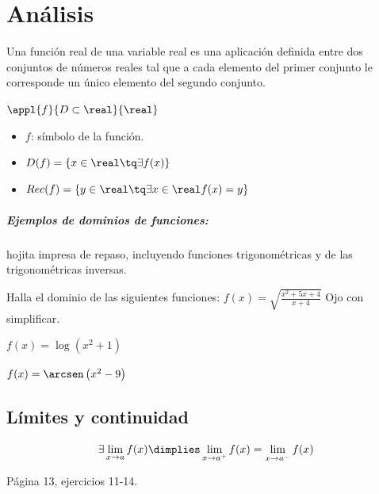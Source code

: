 
\chapter{Análisis}

\begin{defn}
Una función real de una variable real es una aplicación definida entre dos conjuntos de números reales tal que a cada elemento del primer conjunto le corresponde un único elemento del segundo conjunto.

$\appl{f}{D\subset\real}{\real}$

\begin{itemize}
	\item $f$: símbolo de la función.
	\item $D(f) = \{x\in\real \tq \exists f(x)\}$
	\item $Rec(f) = \{y\in\real \tq \exists x \in\real f(x)=y\}$
\end{itemize}
\end{defn}

\paragraph{Ejemplos de dominios de funciones:} hojita impresa de repaso, incluyendo funciones trigonométricas y de las trigonométricas inversas.

\begin{problem}
Halla el dominio de las siguientes funciones:
\ppart $f(x) = \sqrt{\displaystyle\frac{x^2+5x+4}{x+4}}$ \obs Ojo con simplificar.

\ppart  $f(x) = \log\left(x^2+1\right)$

\ppart $f(x) = \arcsen\left(x^2-9\right)$

\solution

\end{problem}

\section{Límites y continuidad}

\begin{theorem}
\[\exists \lim_{x\to a}f(x) \dimplies \lim_{x\to a^+} f(x) = \lim_{x\to a^-}f(x)\]
\end{theorem}

\begin{problem}
Página 13, ejercicios 11-14. 
\solution
\end{problem}

